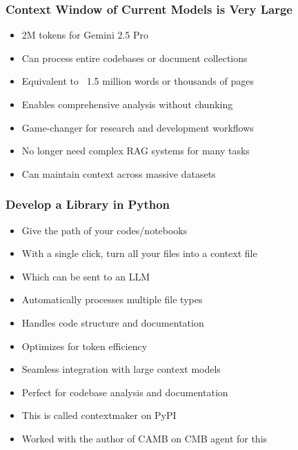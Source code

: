 \documentclass[aspectratio=169]{beamer}
\begin{document}
\begin{frame}
    \frametitle{Context Window of Current Models is Very Large}
    
    \begin{itemize}
        \item 2M tokens for Gemini 2.5 Pro
        \item Can process entire codebases or document collections
        \item Equivalent to ~1.5 million words or thousands of pages
        \item Enables comprehensive analysis without chunking
        \item Game-changer for research and development workflows
        \item No longer need complex RAG systems for many tasks
        \item Can maintain context across massive datasets
    \end{itemize}
\end{frame}

\begin{frame}
    \frametitle{Develop a Library in Python}
    
    \begin{itemize}
        \item Give the path of your codes/notebooks
        \item With a single click, turn all your files into a context file
        \item Which can be sent to an LLM
        \item Automatically processes multiple file types
        \item Handles code structure and documentation
        \item Optimizes for token efficiency
        \item Seamless integration with large context models
        \item Perfect for codebase analysis and documentation
        \item This is called contextmaker on PyPI
        \item Worked with the author of CAMB on CMB agent for this
    \end{itemize}
\end{frame}
\end{document}
